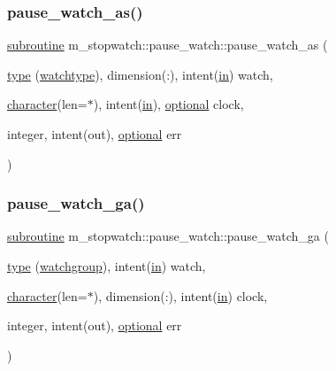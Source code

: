 \subsubsection{\texorpdfstring{pause\+\_\+watch\+\_\+as()}{pause\_watch\_as()}}
{\footnotesize\ttfamily \hyperlink{M__stopwatch_83_8txt_acfbcff50169d691ff02d4a123ed70482}{subroutine} m\+\_\+stopwatch\+::pause\+\_\+watch\+::pause\+\_\+watch\+\_\+as (\begin{DoxyParamCaption}\item[{\hyperlink{stop__watch_83_8txt_a70f0ead91c32e25323c03265aa302c1c}{type} (\hyperlink{structm__stopwatch_1_1watchtype}{watchtype}), dimension(\+:), intent(\hyperlink{M__journal_83_8txt_afce72651d1eed785a2132bee863b2f38}{in})}]{watch,  }\item[{\hyperlink{option__stopwatch_83_8txt_abd4b21fbbd175834027b5224bfe97e66}{character}(len=$\ast$), intent(\hyperlink{M__journal_83_8txt_afce72651d1eed785a2132bee863b2f38}{in}), \hyperlink{option__stopwatch_83_8txt_aa4ece75e7acf58a4843f70fe18c3ade5}{optional}}]{clock,  }\item[{integer, intent(out), \hyperlink{option__stopwatch_83_8txt_aa4ece75e7acf58a4843f70fe18c3ade5}{optional}}]{err }\end{DoxyParamCaption})\hspace{0.3cm}{\ttfamily [private]}}

\mbox{\label{interfacem__stopwatch_1_1pause__watch_a4410e605e76aef2a8ab74fc546087dd1}} 
\subsubsection{\texorpdfstring{pause\+\_\+watch\+\_\+ga()}{pause\_watch\_ga()}}
{\footnotesize\ttfamily \hyperlink{M__stopwatch_83_8txt_acfbcff50169d691ff02d4a123ed70482}{subroutine} m\+\_\+stopwatch\+::pause\+\_\+watch\+::pause\+\_\+watch\+\_\+ga (\begin{DoxyParamCaption}\item[{\hyperlink{stop__watch_83_8txt_a70f0ead91c32e25323c03265aa302c1c}{type} (\hyperlink{structm__stopwatch_1_1watchgroup}{watchgroup}), intent(\hyperlink{M__journal_83_8txt_afce72651d1eed785a2132bee863b2f38}{in})}]{watch,  }\item[{\hyperlink{option__stopwatch_83_8txt_abd4b21fbbd175834027b5224bfe97e66}{character}(len=$\ast$), dimension(\+:), intent(\hyperlink{M__journal_83_8txt_afce72651d1eed785a2132bee863b2f38}{in})}]{clock,  }\item[{integer, intent(out), \hyperlink{option__stopwatch_83_8txt_aa4ece75e7acf58a4843f70fe18c3ade5}{optional}}]{err }\end{DoxyParamCaption})\hspace{0.3cm}{\ttfamily [private]}}

